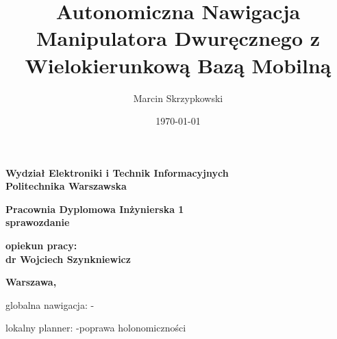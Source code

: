 \documentclass{report}
\title{Autonomiczna Nawigacja Manipulatora Dwuręcznego z Wielokierunkową Bazą Mobilną}
\date{\today}
\author{Marcin Skrzypkowski}
\begin{document}
	
	
	\makeatletter
	\renewcommand{\maketitle}{\begin{titlepage}
		\begin{center}{\LARGE {\bf Wydział Elektroniki i Technik Informacyjnych}}\\
			\vspace{0.4cm}
			{\LARGE {\bf Politechnika Warszawska}}\\
			\vspace{0.3cm}
		\end{center}
		\vspace{5cm}
		\begin{center}
			{\bf \LARGE Pracownia Dyplomowa Inżynierska  1\\ sprawozdanie  \vskip 0.1cm}
		\end{center}
		\vspace{1cm}
		\begin{center}
			{\bf \LARGE \@title}
		\end{center}
		\vspace{2cm}
		\begin{center}
			{\bf \Large \@author \par}
		\end{center}
		\vspace*{\stretch{1}}
		\begin{center}
			{\bf \large opiekun pracy: \\ dr Wojciech Szynkniewicz\par}
		\end{center}
		\vspace*{\stretch{5}}
		\begin{center}
			\bf{\large{Warszawa, \@date\vskip 0.1cm}}
		\end{center}
		\end{titlepage}
}
\makeatother	


	

	\maketitle
	\newpage



	\tableofcontents

	\newpage
	
	
globalna nawigacja:
	-
	
lokalny planner:
	-poprawa holonomiczności
	
	

	
		
	
	
	
	
	
		
\end{document}
